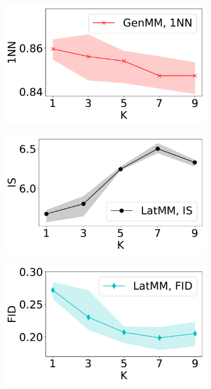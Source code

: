 \begin{figure}[!ht]
\begin{subfigure}{.24\textwidth}
  \end{subfigure}
  \centering
  \begin{subfigure}{0.24\textwidth}
    \centering
    \includegraphics[width=1\linewidth]{images/fashion-mnist/scores/std1EMGM-NM/EMGM-NM-1NN-K.pdf}
  \end{subfigure}
  \centering
  \begin{subfigure}{.24\textwidth}
    \centering
    \includegraphics[width=1\linewidth]{images/fashion-mnist/scores/std1EMGM-SM/EMGM-SM-IS-K.pdf}
  \end{subfigure}
  \centering
  \begin{subfigure}{.24\textwidth}
    \centering
    \includegraphics[width=1\linewidth]{images/fashion-mnist/scores/std1EMGM-SM/EMGM-SM-FID-K.pdf}

\end{subfigure}
\end{figure}
